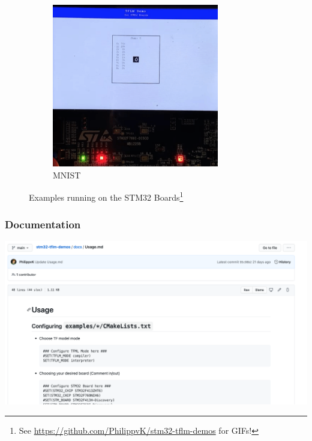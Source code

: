 \documentclass{tum-presentation}
\begin{document}
\begin{frame}
\begin{figure}[h]
\begin{subfigure}[b]{0.3\textwidth}
         \label{fig:gif_mirco_speech}
     \end{subfigure}
     \hfill
     \begin{subfigure}[b]{0.3\textwidth}
         \centering
         \includegraphics[width=0.8\textwidth]{figures/mnist_gif.png}
         \caption{MNIST}
         \label{fig:gif_mnist}
     \end{subfigure}
        \caption{Examples running on the STM32 Boards\footnote{See \url{https://github.com/PhilippvK/stm32-tflm-demos} for GIFs!}}
        \label{fig:gifs}
\end{figure}

\end{frame}

\begin{frame}
  \frametitle{Documentation}
  
  
  \includegraphics[width=.5\textwidth]{figures/docs.png}

\end{frame}
\end{document}
